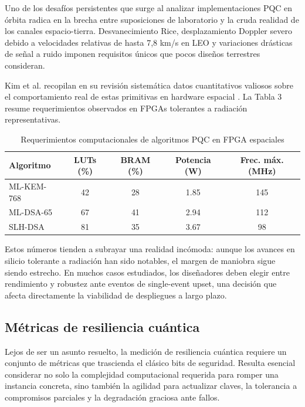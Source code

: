 Uno de los desafíos persistentes que surge al analizar implementaciones PQC en órbita radica en la brecha entre suposiciones de laboratorio y la cruda realidad de los canales espacio-tierra. Desvanecimiento Rice, desplazamiento Doppler severo debido a velocidades relativas de hasta 7,8 km/s en LEO y variaciones drásticas de señal a ruido imponen requisitos únicos que pocos diseños terrestres consideran.

Kim et al. recopilan en su revisión sistemática datos cuantitativos valiosos sobre el comportamiento real de estas primitivas en hardware espacial \cite{Kim2026}. La Tabla 3 resume requerimientos observados en FPGAs tolerantes a radiación representativas.

\begin{table}[t]
\centering
\caption{Requerimientos computacionales de algoritmos PQC en FPGA espaciales}
\label{tab:requerimientos_fpga}
\begin{tabular}{lcccc}
\hline
\textbf{Algoritmo} & \textbf{LUTs (\%)} & \textbf{BRAM (\%)} & \textbf{Potencia (W)} & \textbf{Frec. máx. (MHz)} \\
\hline
ML-KEM-768 & 42 & 28 & 1.85 & 145 \\
ML-DSA-65 & 67 & 41 & 2.94 & 112 \\
SLH-DSA & 81 & 35 & 3.67 & 98 \\
\hline
\end{tabular}
\end{table}

Estos números tienden a subrayar una realidad incómoda: aunque los avances en silicio tolerante a radiación han sido notables, el margen de maniobra sigue siendo estrecho. En muchos casos estudiados, los diseñadores deben elegir entre rendimiento y robustez ante eventos de single-event upset, una decisión que afecta directamente la viabilidad de despliegues a largo plazo.

\subsection{Métricas de resiliencia cuántica}

Lejos de ser un asunto resuelto, la medición de resiliencia cuántica requiere un conjunto de métricas que trascienda el clásico bits de seguridad. Resulta esencial considerar no solo la complejidad computacional requerida para romper una instancia concreta, sino también la agilidad para actualizar claves, la tolerancia a compromisos parciales y la degradación graciosa ante fallos.

